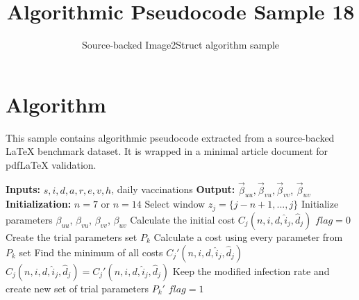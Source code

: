 \documentclass[11pt]{article}
\title{Algorithmic Pseudocode Sample 18}
\author{Source-backed Image2Struct algorithm sample}
\date{}
\begin{document}
\maketitle
\section{Algorithm}
This sample contains algorithmic pseudocode extracted from a source-backed LaTeX benchmark dataset. It is wrapped in a minimal article document for pdfLaTeX validation.

\begin{algorithm}[htbp]
\caption{Source-backed algorithmic procedure}
\begin{algorithmic}[1]
\Statex \textbf{Inputs:} $s,i,d,a,r,e,v,h$, daily vaccinations
\Statex \textbf{Output:}
{$\vec{\beta}_{uu}, \vec{\beta}_{vu}, \vec{\beta}_{vv}$, $\vec{\beta}_{uv}$}
\Statex \textbf{Initialization:} $n=7$ or $n= 14$
\State Select window $z_{j}=\{j-n+1,...,j\}$
\State Initialize parameters $\beta_{uu}$, $\beta_{vu}$, $\beta_{vv}$, $\beta_{uv}$
\State Calculate the initial cost $C_{j}(n,i,d,\hat{i}_{j},\hat{d}_{j})$
\State $flag=0$
\State Create the trial parameters set $P_{k}$
\State Calculate a cost using every parameter from $P_{k}$ set
\State Find the minimum of all costs $C_{j}'(n,i,d,\hat{i}_{j},\hat{d}_{j})$ 
\State $C_{j}(n,i,d,\hat{i}_{j},\hat{d}_{j}) = C_{j}'(n,i,d,\hat{i}_{j},\hat{d}_{j})$
\State Keep the modified infection rate and create new set of trial parameters $P_{k}'$
\Else
\State $flag=1$
\EndIf
\EndWhile
\EndFor
\end{algorithmic}
\end{algorithm}
\end{document}

